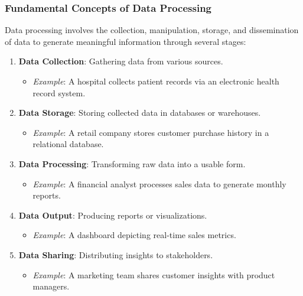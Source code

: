 \documentclass[aspectratio=169]{beamer}
\begin{document}
\begin{frame}[fragile]
    \frametitle{Fundamental Concepts of Data Processing}
    Data processing involves the collection, manipulation, storage, and dissemination of data to generate meaningful information through several stages:
        
    \begin{enumerate}
        \item \textbf{Data Collection}: Gathering data from various sources.
        \begin{itemize}
            \item \textit{Example}: A hospital collects patient records via an electronic health record system.
        \end{itemize}

        \item \textbf{Data Storage}: Storing collected data in databases or warehouses.
        \begin{itemize}
            \item \textit{Example}: A retail company stores customer purchase history in a relational database.
        \end{itemize}

        \item \textbf{Data Processing}: Transforming raw data into a usable form.
        \begin{itemize}
            \item \textit{Example}: A financial analyst processes sales data to generate monthly reports.
        \end{itemize}

        \item \textbf{Data Output}: Producing reports or visualizations.
        \begin{itemize}
            \item \textit{Example}: A dashboard depicting real-time sales metrics.
        \end{itemize}

        \item \textbf{Data Sharing}: Distributing insights to stakeholders.
        \begin{itemize}
            \item \textit{Example}: A marketing team shares customer insights with product managers.
        \end{itemize}
    \end{enumerate}
\end{frame}
\end{document}

